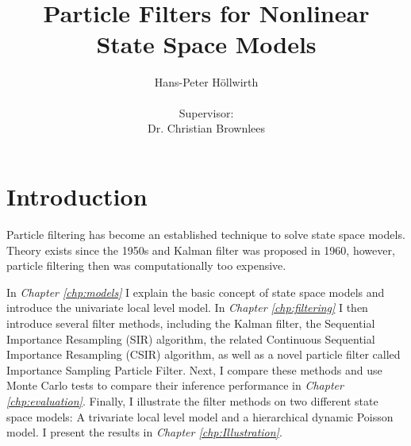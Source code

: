 \documentclass[11pt, oneside]{scrreprt}   	%
\title{\textit{}\\\textit{}\\Particle Filters for Nonlinear\\ State Space Models}
\author{Hans-Peter H{\"o}llwirth \\  \\Supervisor: \\ Dr. Christian Brownlees}
\date{}
\begin{document}
\maketitle

\newpage
\setcounter{secnumdepth}{1}
\setcounter{tocdepth}{1}
\tableofcontents
\newpage

\chapter{Introduction}
\label{chp:introduction}


Particle filtering has become an established technique to solve state space models. Theory exists since the 1950s and Kalman filter was proposed in 1960, however, particle filtering then was computationally too expensive.

%
In \textit{Chapter \ref{chp:models}} I explain the basic concept of state space models and introduce the univariate local level model. In \textit{Chapter \ref{chp:filtering}} I then introduce several filter methods, including the Kalman filter, the Sequential Importance Resampling (SIR) algorithm, the related Continuous Sequential Importance Resampling (CSIR) algorithm, as well as a novel particle filter called Importance Sampling Particle Filter. Next, I compare these methods and use Monte Carlo tests to compare their inference performance in \textit{Chapter \ref{chp:evaluation}}. Finally, I illustrate the filter methods on two different state space models: A trivariate local level model and a hierarchical dynamic Poisson model. I present the results in \textit{Chapter \ref{chp:Illustration}}.\\
\end{document}
